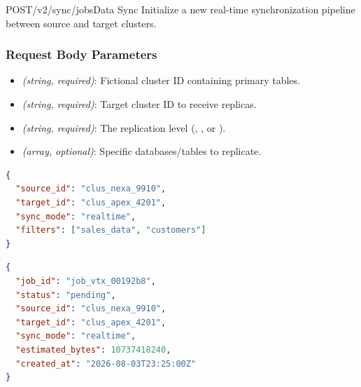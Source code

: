 \par
\vspace{1.5em}

\begin{apiendpoint}{POST}{/v2/sync/jobs}{Data Sync}
Initialize a new real-time synchronization pipeline between source and target clusters.
\end{apiendpoint}

\subsubsection{Request Body Parameters}
\begin{itemize}
  \item {} \textit{(string, required)}: Fictional cluster ID containing primary tables.
  \item {} \textit{(string, required)}: Target cluster ID to receive replicas.
  \item {} \textit{(string, required)}: The replication level (, , or ).
  \item {} \textit{(array, optional)}: Specific databases/tables to replicate.
\end{itemize}

\noindent
\begin{minipage}[t]{0.48\linewidth}
  \begin{tcolorbox}[codeboxstyle, title={Example Request (JSON)}]
\begin{lstlisting}[language=json]
{
  "source_id": "clus_nexa_9910",
  "target_id": "clus_apex_4201",
  "sync_mode": "realtime",
  "filters": ["sales_data", "customers"]
}
\end{lstlisting}
  \end{tcolorbox}
\end{minipage}
\hfill
\begin{minipage}[t]{0.48\linewidth}
  \begin{tcolorbox}[codeboxstyle, title={Example Response (201 Created)}]
\begin{lstlisting}[language=json]
{
  "job_id": "job_vtx_00192b8",
  "status": "pending",
  "source_id": "clus_nexa_9910",
  "target_id": "clus_apex_4201",
  "sync_mode": "realtime",
  "estimated_bytes": 10737418240,
  "created_at": "2026-08-03T23:25:00Z"
}
\end{lstlisting}
  \end{tcolorbox}
\end{minipage}


